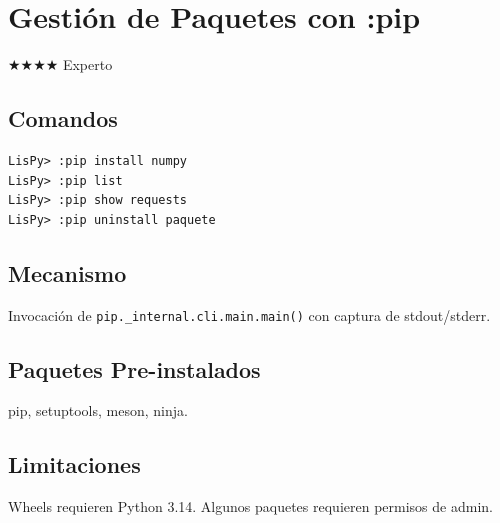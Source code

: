 \chapter{Gestión de Paquetes con :pip}
\label{chap:pip}
{\huge$\bigstar$}{\huge$\bigstar$}{\huge$\bigstar$}{\huge$\bigstar$} Experto

\section{Comandos}
\begin{verbatim}
LisPy> :pip install numpy
LisPy> :pip list
LisPy> :pip show requests
LisPy> :pip uninstall paquete
\end{verbatim}

\section{Mecanismo}
Invocación de \texttt{pip.\_internal.cli.main.main()} con captura de
stdout/stderr.

\section{Paquetes Pre-instalados}
pip, setuptools, meson, ninja.

\section{Limitaciones}
Wheels requieren Python 3.14. Algunos paquetes requieren permisos de admin.

